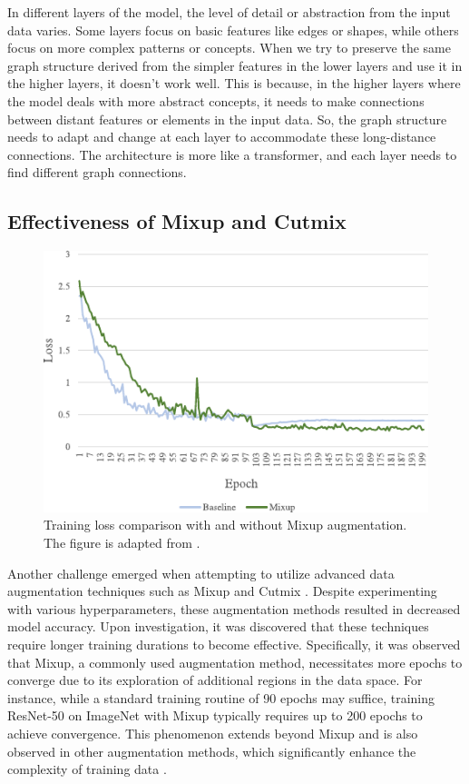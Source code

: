 \documentclass[sigconf, nonacm]{acmart}
\begin{document}
In different layers of the model, the level of detail or abstraction from the input data varies. Some layers focus on basic features like edges or shapes, while others focus on more complex patterns or concepts. When we try to preserve the same graph structure derived from the simpler features in the lower layers and use it in the higher layers, it doesn't work well. This is because, in the higher layers where the model deals with more abstract concepts, it needs to make connections between distant features or elements in the input data. So, the graph structure needs to adapt and change at each layer to accommodate these long-distance connections. The architecture is more like a transformer, and each layer needs to find different graph connections.

\subsection{Effectiveness of Mixup and Cutmix}
\begin{figure}[t]
  \centering
  \includegraphics[width=0.9\linewidth]{figures/mixup_training.pdf}
  \caption{Training loss comparison with and without Mixup augmentation. The figure is adapted from \cite{mixupwithouthesitation}.}
  \label{fig:mixup_training}
\end{figure}

Another challenge emerged when attempting to utilize advanced data augmentation techniques such as Mixup \cite{mixup} and Cutmix \cite{cutmix}. Despite experimenting with various hyperparameters, these augmentation methods resulted in decreased model accuracy. Upon investigation, it was discovered that these techniques require longer training durations to become effective. Specifically, it was observed that Mixup, a commonly used augmentation method, necessitates more epochs to converge due to its exploration of additional regions in the data space. For instance, while a standard training routine of 90 epochs may suffice, training ResNet-50 on ImageNet with Mixup typically requires up to 200 epochs to achieve convergence. This phenomenon extends beyond Mixup and is also observed in other augmentation methods, which significantly enhance the complexity of training data \cite{cutmix, gridmask}.
\end{document}
